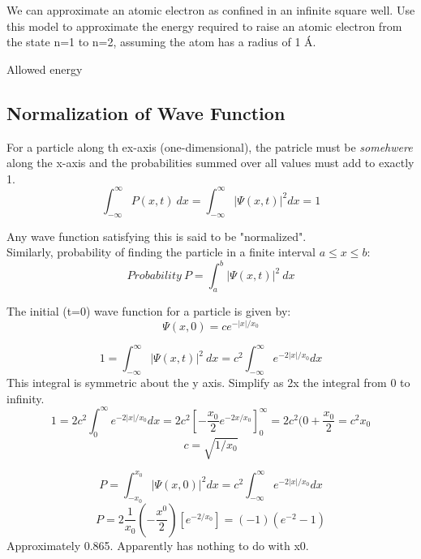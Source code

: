 \documentclass[class=article,crop=false]{standalone}
\begin{document}
\begin{question}
	We can approximate an atomic electron as confined in an infinite square well. Use this model to approximate the energy required to raise an atomic electron from the state n=1 to n=2, assuming the atom has a radius of 1 Á.
	\begin{answer}[Answer]
		Allowed energy
	\end{answer}
\end{question}


\subsection{Normalization of Wave Function}
For a particle along th ex-axis (one-dimensional), the patricle must be \emph{somehwere} along the x-axis and the probabilities summed over all values must add to exactly 1.
$$  \int_{-\infty}^\infty P(x,t)\ dx =  \int_{-\infty}^\infty |\Psi(x,t)|^2 dx = 1 $$

Any wave function satisfying this is said to be "normalized".\\

Similarly, probability of finding the particle in a finite interval $a \leq x \leq b$:
$$ Probability\ P = \int_a^b |\Psi(x,t)|^2\ dx $$

\begin{question}[Example]
	The initial (t=0) wave function for a particle is given by:
	$$ \Psi(x,0) = ce^{-|x|/x_0} $$

	\begin{answer}
		$$1 = \int_{-\infty}^\infty |\Psi(x,t)|^2\ dx = c^2 \int_{-\infty}^\infty e^{-2|x|/x_0} dx $$
		This integral is symmetric about the y axis. Simplify as 2x the integral from 0 to infinity.
		$$ 1 = 2 c^2 \int_{0}^\infty e^{-2|x|/x_0} dx = 2c^2\left[-\frac{x_0}{2} e^{-2x/x_0}\right]^\infty_0 = 2c^2(0 + \frac{x_0}{2} = c^2 x_0 $$
		$$ c = \sqrt{1/x_0} $$
	\end{answer}
	\begin{answer}
		$$ P = \int_{-x_0}^{x_0} |\Psi(x,0)|^2 dx =c^2 \int_{-\infty}^\infty e^{-2|x|/x_0} dx $$
		$$ P = 2\frac{1}{x_0} \left( -\frac{x^0}{2} \right) \left[ e^{-2/x_0}\right] = (-1)(e^{-2} - 1) $$
		Approximately 0.865. Apparently has nothing to do with x0.
	\end{answer}

\end{question}
\end{document}
